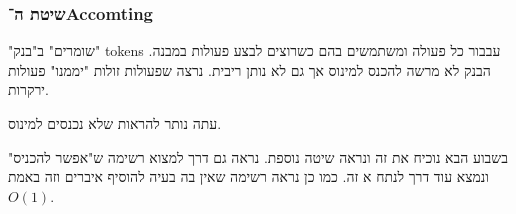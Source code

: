 \documentclass[]{article}
\begin{document}
	\subsubsection*{שיטת ה־Accomting}
	"שומרים" ב"בנק" tokens עבבור כל פעולה ומשתמשים בהם כשרוצים לבצע פעולות במבנה. הבנק לא מרשה להכנס למינוס אך גם לא נותן ריבית. נרצה שפעולות זולות "יממנו" פעולות ירקרות. 
	
	עתה נותר להראות שלא נכנסים למינוס. 
	
	בשבוע הבא נוכיח את זה ונראה שיטה נוספת. נראה גם דרך למצוא רשימה ש"אפשר להכניס" ונמצא עוד דרך לנתח א זה. כמו כן נראה רשימה שאין בה בעיה להוסיף איברים וזה באמת $O(1)$. 
	
	
\end{document}
